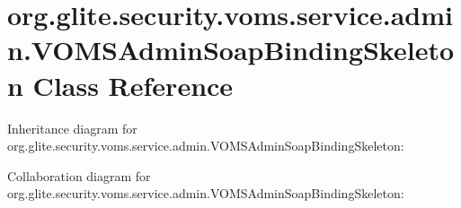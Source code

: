 \hypertarget{classorg_1_1glite_1_1security_1_1voms_1_1service_1_1admin_1_1VOMSAdminSoapBindingSkeleton}{
\section{org.glite.security.voms.service.admin.VOMSAdminSoapBindingSkeleton Class Reference}
\label{classorg_1_1glite_1_1security_1_1voms_1_1service_1_1admin_1_1VOMSAdminSoapBindingSkeleton}
}


Inheritance diagram for org.glite.security.voms.service.admin.VOMSAdminSoapBindingSkeleton:


Collaboration diagram for org.glite.security.voms.service.admin.VOMSAdminSoapBindingSkeleton:
